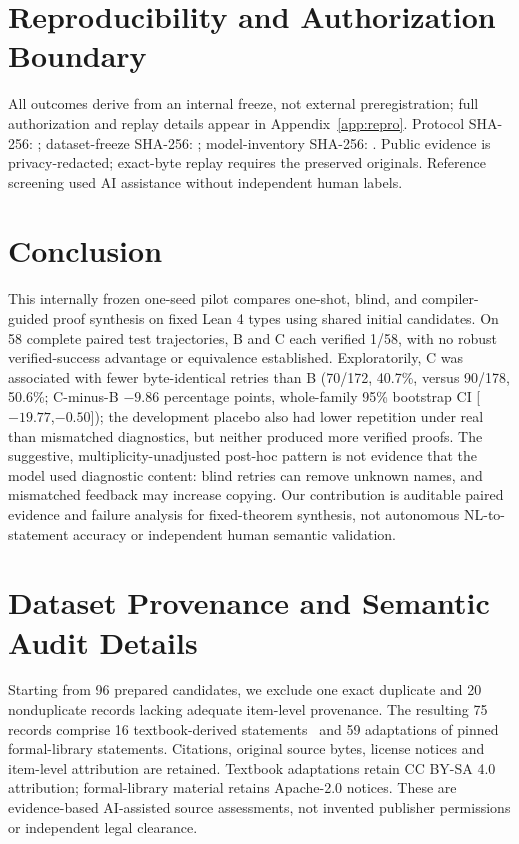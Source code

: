 \documentclass[runningheads,a4paper]{llncs}
\begin{document}
\section{Reproducibility and Authorization Boundary}
All outcomes derive from an internal freeze, not external
preregistration; full authorization and replay details appear
in Appendix~\ref{app:repro}. Protocol SHA-256:
;
dataset-freeze SHA-256:
;
model-inventory SHA-256:
.
Public evidence is privacy-redacted; exact-byte replay requires the
preserved originals. Reference screening used AI assistance without
independent human labels.

\section{Conclusion}
This internally frozen one-seed pilot compares one-shot, blind, and
compiler-guided proof synthesis on fixed Lean 4 types using shared
initial candidates. On 58 complete paired test trajectories, B and
C each verified 1/58, with no robust verified-success advantage
or equivalence established. Exploratorily, C was associated with
fewer byte-identical retries than B (70/172, 40.7\%, versus 90/178,
50.6\%; C-minus-B $-9.86$ percentage points, whole-family
95\% bootstrap CI [$-19.77$,$-0.50$]); the development placebo
also had lower repetition under real than mismatched diagnostics,
but neither produced more verified proofs. The suggestive,
multiplicity-unadjusted post-hoc pattern is not evidence that
the model used diagnostic content: blind retries can remove unknown
names, and mismatched feedback may increase copying. Our contribution
is auditable paired evidence and failure analysis for fixed-theorem
synthesis, not autonomous NL-to-statement accuracy or independent
human semantic validation.



\appendix
\section{Dataset Provenance and Semantic Audit Details}
\label{app:dataset}
Starting from 96 prepared candidates, we exclude one exact duplicate and 20
nonduplicate records lacking adequate item-level provenance. The resulting 75
records comprise 16 textbook-derived statements~\cite{levin2021dmoi} and 59
adaptations of pinned formal-library statements. Citations, original source
bytes, license notices and item-level attribution are retained. Textbook
adaptations retain CC BY-SA 4.0 attribution; formal-library material retains
Apache-2.0 notices. These are evidence-based AI-assisted source assessments,
not invented publisher permissions or independent legal clearance.
\end{document}
